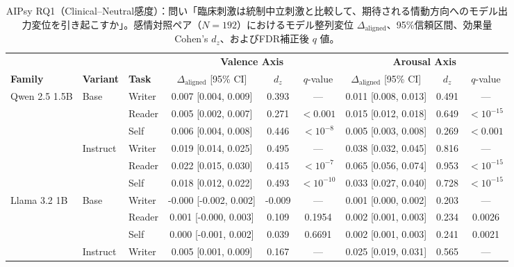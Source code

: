 \begin{table}[htbp]
\centering
\small
\caption{AIPsy RQ1（Clinical--Neutral感度）：問い「臨床刺激は統制中立刺激と比較して、期待される情動方向へのモデル出力変位を引き起こすか」。感情対照ペア（$N=192$）におけるモデル整列変位 $\Delta_{\text{aligned}}$、95\%信頼区間、効果量 Cohen's $d_z$、およびFDR補正後 $q$ 値。}
\label{tab:behavioral_aipsy_rq1_sensitivity}
\begin{tabular}{lll ccc ccc}
\toprule
 & & & \multicolumn{3}{c}{\textbf{Valence Axis}} & \multicolumn{3}{c}{\textbf{Arousal Axis}} \\
\cmidrule(lr){4-6} \cmidrule(lr){7-9}
\textbf{Family} & \textbf{Variant} & \textbf{Task} & $\Delta_{\text{aligned}}$ [95\% CI] & $d_z$ & $q$-value & $\Delta_{\text{aligned}}$ [95\% CI] & $d_z$ & $q$-value \\
\midrule
\multirow{6}{*}{Qwen 2.5 1.5B} & \multirow{3}{*}{Base} & Writer     & 0.007 [0.004, 0.009] & 0.393 & --- & 0.011 [0.008, 0.013] & 0.491 & --- \\
                       &                      & Reader     & 0.005 [0.002, 0.007] & 0.271 & $<0.001$ & 0.015 [0.012, 0.018] & 0.649 & $<10^{-15}$ \\
                       &                      & Self       & 0.006 [0.004, 0.008] & 0.446 & $<10^{-8}$ & 0.005 [0.003, 0.008] & 0.269 & $<0.001$ \\
\cmidrule(lr){2-9}
                       & \multirow{3}{*}{Instruct} & Writer     & 0.019 [0.014, 0.025] & 0.495 & --- & 0.038 [0.032, 0.045] & 0.816 & --- \\
                       &                      & Reader     & 0.022 [0.015, 0.030] & 0.415 & $<10^{-7}$ & 0.065 [0.056, 0.074] & 0.953 & $<10^{-15}$ \\
                       &                      & Self       & 0.018 [0.012, 0.022] & 0.493 & $<10^{-10}$ & 0.033 [0.027, 0.040] & 0.728 & $<10^{-15}$ \\
\midrule
\multirow{6}{*}{Llama 3.2 1B} & \multirow{3}{*}{Base} & Writer     & -0.000 [-0.002, 0.002] & -0.009 & --- & 0.001 [0.000, 0.002] & 0.203 & --- \\
                       &                      & Reader     & 0.001 [-0.000, 0.003] & 0.109 & 0.1954 & 0.002 [0.001, 0.003] & 0.234 & 0.0026 \\
                       &                      & Self       & 0.000 [-0.001, 0.002] & 0.039 & 0.6691 & 0.002 [0.001, 0.003] & 0.241 & 0.0021 \\
\cmidrule(lr){2-9}
                       & \multirow{3}{*}{Instruct} & Writer     & 0.005 [0.001, 0.009] & 0.167 & --- & 0.025 [0.019, 0.031] & 0.565 & --- \\

\end{tabular}
\end{table}
